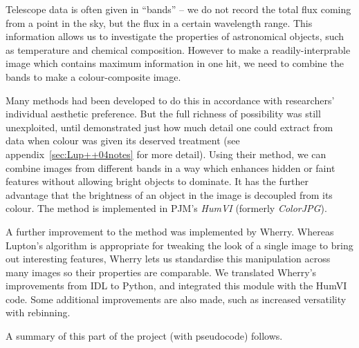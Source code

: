 \documentclass[letterpaper, 11pt]{article}
\begin{document}
Telescope data is often given in ``bands'' -- we do not record the total flux coming from a point in the sky, but the flux in a certain wavelength range. This information allows us to investigate the properties of astronomical objects, such as temperature and chemical composition. However to make a readily-interprable image which contains maximum information in one hit, we need to combine the bands to make a colour-composite image.

Many methods had been developed to do this in accordance with researchers' individual aesthetic preference. But the full richness of possibility was still unexploited, until \citet{Lup++04} demonstrated just how much detail one could extract from data when colour was given its deserved treatment (see appendix~\ref{sec:Lup++04notes} for more detail). Using their method, we can combine images from different bands in a way which enhances hidden or faint features without allowing bright objects to dominate. It has the further advantage that the brightness of an object in the image is decoupled from its colour. The method is implemented in PJM's \emph{HumVI} (formerly \emph{ColorJPG}).

A further improvement to the method was implemented by Wherry. Whereas Lupton's algorithm is appropriate for tweaking the look of a single image to bring out interesting features, Wherry lets us standardise this manipulation across many images so their properties are comparable. We translated Wherry's improvements from IDL to Python, and integrated this module with the HumVI code. Some additional improvements are also made, such as increased versatility with rebinning.

A summary of this part of the project (with pseudocode) follows.
\end{document}
